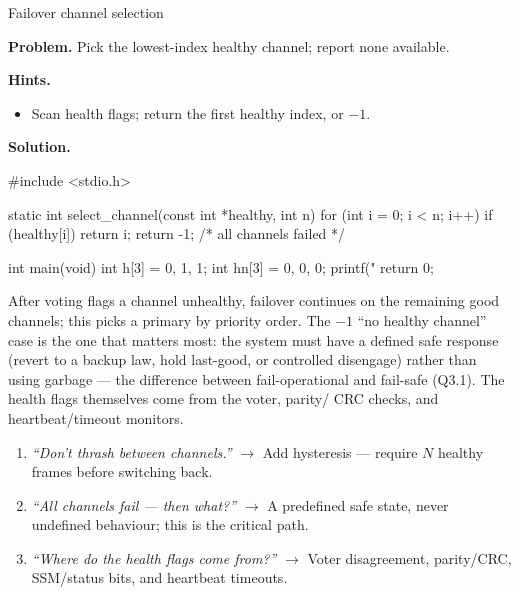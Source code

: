 \begin{gymproblem}{Failover channel selection}

\textbf{Problem.} Pick the lowest-index healthy channel; report none available.

\textbf{Hints.}
\begin{itemize}
\item Scan health flags; return the first healthy index, or $-1$.
\end{itemize}

\attempt

\textbf{Solution.}
\begin{cgym}
#include <stdio.h>

static int select_channel(const int *healthy, int n) {
    for (int i = 0; i < n; i++)
        if (healthy[i]) return i;
    return -1;                       /* all channels failed */
}

int main(void) {
    int h[3]  = {0, 1, 1};
    int hn[3] = {0, 0, 0};
    printf("%
    return 0;
}
\end{cgym}

After voting flags a channel unhealthy, failover continues on the remaining
good channels; this picks a primary by priority order. The $-1$ ``no healthy
channel'' case is the one that matters most: the system must have a defined
safe response (revert to a backup law, hold last-good, or controlled
disengage) rather than using garbage --- the difference between fail-operational
and fail-safe (Q3.1). The health flags themselves come from the voter, parity/
CRC checks, and heartbeat/timeout monitors.

\followups
\begin{enumerate}
\item \emph{``Don't thrash between channels.''} $\rightarrow$ Add hysteresis ---
  require $N$ healthy frames before switching back.
\item \emph{``All channels fail --- then what?''} $\rightarrow$ A predefined
  safe state, never undefined behaviour; this is the critical path.
\item \emph{``Where do the health flags come from?''} $\rightarrow$ Voter
  disagreement, parity/CRC, SSM/status bits, and heartbeat timeouts.
\end{enumerate}
\end{gymproblem}

